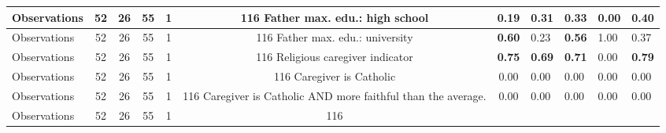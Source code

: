 \begin{tabular}{l c c c c c c }
\midrule
Observations &        52 &        26 &        55 &         1 &       116
Father max. edu.: high school & \textbf{     0.19} &      0.31 &      0.33 &      0.00 &      0.40 \\
\midrule
Observations &        52 &        26 &        55 &         1 &       116
Father max. edu.: university & \textbf{     0.60} &      0.23 & \textbf{     0.56} &      1.00 &      0.37 \\
\midrule
Observations &        52 &        26 &        55 &         1 &       116
Religious caregiver indicator & \textbf{     0.75} & \textbf{     0.69} & \textbf{     0.71} &      0.00 & \textbf{     0.79} \\
\midrule
Observations &        52 &        26 &        55 &         1 &       116
Caregiver is Catholic &      0.00 &      0.00 &      0.00 &      0.00 &      0.00 \\
\midrule
Observations &        52 &        26 &        55 &         1 &       116
Caregiver is Catholic AND more faithful than the average. &      0.00 &      0.00 &      0.00 &      0.00 &      0.00 \\
\midrule
Observations &        52 &        26 &        55 &         1 &       116
\bottomrule
\end{tabular}
